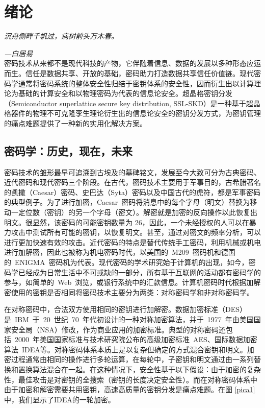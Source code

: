 
\chapter{绪\hspace{6pt}论}
\label{ch1}
\emph{\kaishu 沉舟侧畔千帆过，病树前头万木春。}

\emph{\kaishu \hfill ---白居易}\\


密码技术从来都不是现代科技的产物，它伴随着信息、数据的发展以多种形态应运而生。信任是数据共享、开放的基础，密码助力打造数据共享信任价值链。现代密码学通常将密码系统的整体安全性归结于密钥体系的安全性，因而衍生出以计算理论为基础的计算安全和以物理密码为代表的信息论安全。超晶格密钥分发（Semiconductor superlattice secure key distribution, SSL-SKD）是一种基于超晶格器件的物理不可克隆孪生理论衍生出的信息论安全的密钥分发方式，为密钥管理的痛点难题提供了一种新的实用化解决方案。



\section{密码学：历史，现在，未来}

密码技术的雏形最早可追溯到古埃及的墓碑铭文，发展至今大致可分为古典密码、近代密码和现代密码三个阶段\cite{katz2020introduction,1996The}。在古代，密码技术主要用于军事目的，古希腊著名的凯撒（Caesar）密码、史巴达（Syta）密码以及中国古代的虎符，都是军事密码的典型例子\cite{stinson2018cryptography}。为了进行加密，Caesar~密码将消息中的每个字母（明文）替换为移动一定位数（密钥）的另一个字母（密文）。解密就是加密的反向操作以此恢复出明文。很显然，该密码的可能密钥数量为 26，因此，一个未经授权的人可以在暴力攻击中测试所有可能的密钥，以恢复明文。甚至，通过对密文的频率分析，可以进行更加快速有效的攻击。近代密码的特点是替代传统手工密码，利用机械或机电进行加解密，因此也被称为机电密码时代，以美国的~M209~密码机和德国的~ENIGMA~密码机为代表\cite{buchmann2013introduction,baiyanlin}。现代密码的学术研究始于计算机的出现，如今，密码学已经成为日常生活中不可或缺的一部分，所有基于互联网的活动都有密码学的参与，如简单的~Web~浏览，或银行系统中的汇款信息。计算机密码时代根据加解密使用的密钥是否相同将密码技术主要分为两类：对称密码学和非对称密码学\cite{shinaier}。


在对称密码中，合法双方使用相同的密钥进行加解密。数据加密标准（DES）是~IBM~于~20~世纪~70~年代初设计的一种对称加密算法，并于~1977~年由美国国家安全局（NSA）修改，作为商业应用的加密标准\cite{des1977}。典型的对称密码还包括~2000~年美国国家标准与技术研究院公布的高级加密标准~AES\cite{standard2001announcing}、国际数据加密算法~IDEA\cite{lai1990proposal}等。对称密码体系本质上是以复杂但确定的方式混合密钥和明文。加密过程通常由相同的操作进行多轮运算，在每轮中，子密钥和明文通过由一系列替换和置换算法混合在一起。在这种情况下，安全性基于以下假设：由于加密的复杂性，最佳攻击是对密钥的全搜索（密钥的长度决定安全性）。而在对称密码体系中由于加密和解密需要共用密钥，高速高质量的密钥分发是痛点难题。在图 \ref{pica1} 中，我们显示了IDEA的一轮加密。

